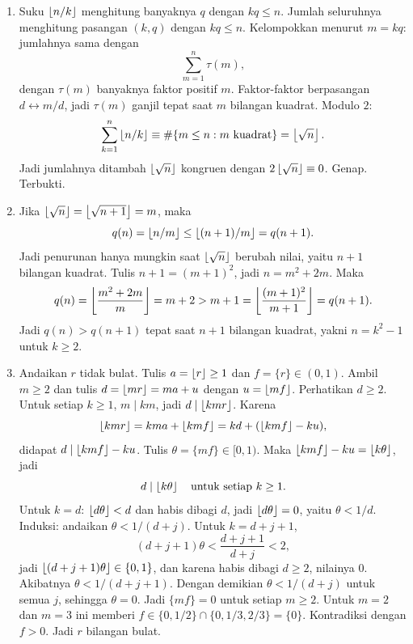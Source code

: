 \documentclass[12pt]{scrartcl}
\begin{document}
\begin{enumerate}[resume]
	\item Suku $\left\lfloor n/k \right\rfloor$ menghitung banyaknya $q$ dengan $kq \le n$.
	Jumlah seluruhnya menghitung pasangan $(k, q)$ dengan $kq \le n$.
	Kelompokkan menurut $m = kq$: jumlahnya sama dengan
	\[ \sum_{m=1}^{n} \tau(m), \]
	dengan $\tau(m)$ banyaknya faktor positif $m$.
	Faktor-faktor berpasangan $d \leftrightarrow m/d$,
	jadi $\tau(m)$ ganjil tepat saat $m$ bilangan kuadrat.
	Modulo $2$:
	\[ \sum_{k=1}^{n}\left\lfloor n/k \right\rfloor
	\equiv \#\{m \le n : m \text{ kuadrat}\}
	= \left\lfloor \sqrt{n} \right\rfloor. \]
	Jadi jumlahnya ditambah $\left\lfloor \sqrt{n} \right\rfloor$
	kongruen dengan $2\left\lfloor \sqrt{n} \right\rfloor \equiv 0$.
	Genap. Terbukti.

	\item Jika $\left\lfloor \sqrt{n} \right\rfloor = \left\lfloor \sqrt{n+1} \right\rfloor = m$, maka
	\[ q(n) = \left\lfloor n/m \right\rfloor \le \left\lfloor (n+1)/m \right\rfloor = q(n+1). \]
	Jadi penurunan hanya mungkin saat $\left\lfloor \sqrt{n} \right\rfloor$ berubah nilai,
	yaitu $n+1$ bilangan kuadrat.
	Tulis $n+1 = (m+1)^2$, jadi $n = m^2 + 2m$. Maka
	\[ q(n) = \left\lfloor \frac{m^2+2m}{m} \right\rfloor = m + 2
	> m + 1 = \left\lfloor \frac{(m+1)^2}{m+1} \right\rfloor = q(n+1). \]
	Jadi $q(n) > q(n+1)$ tepat saat $n+1$ bilangan kuadrat,
	yakni $n = k^2 - 1$ untuk $k \ge 2$.

	\item Andaikan $r$ tidak bulat.
	Tulis $a = \left\lfloor r \right\rfloor \ge 1$ dan $f = \{r\} \in (0, 1)$.
	Ambil $m \ge 2$ dan tulis $d = \left\lfloor mr \right\rfloor = ma + u$
	dengan $u = \left\lfloor mf \right\rfloor$. Perhatikan $d \ge 2$.
	Untuk setiap $k \ge 1$, $m \mid km$, jadi $d \mid \left\lfloor kmr \right\rfloor$.
	Karena
	\[ \left\lfloor kmr \right\rfloor = kma + \left\lfloor kmf \right\rfloor = kd + (\left\lfloor kmf \right\rfloor - ku), \]
	didapat $d \mid \left\lfloor kmf \right\rfloor - ku$.
	Tulis $\theta = \{mf\} \in [0, 1)$. Maka
	$\left\lfloor kmf \right\rfloor - ku = \left\lfloor k\theta \right\rfloor$, jadi
	\[ d \mid \left\lfloor k\theta \right\rfloor \quad \text{untuk setiap } k \ge 1. \]
	Untuk $k = d$: $\left\lfloor d\theta \right\rfloor < d$ dan habis dibagi $d$,
	jadi $\left\lfloor d\theta \right\rfloor = 0$, yaitu $\theta < 1/d$.
	Induksi: andaikan $\theta < 1/(d+j)$. Untuk $k = d+j+1$,
	\[ (d+j+1)\theta < \frac{d+j+1}{d+j} < 2, \]
	jadi $\left\lfloor (d+j+1)\theta \right\rfloor \in \{0, 1\}$,
	dan karena habis dibagi $d \ge 2$, nilainya $0$.
	Akibatnya $\theta < 1/(d+j+1)$.
	Dengan demikian $\theta < 1/(d+j)$ untuk semua $j$,
	sehingga $\theta = 0$.
	Jadi $\{mf\} = 0$ untuk setiap $m \ge 2$.
	Untuk $m = 2$ dan $m = 3$ ini memberi
	$f \in \{0, 1/2\} \cap \{0, 1/3, 2/3\} = \{0\}$.
	Kontradiksi dengan $f > 0$. Jadi $r$ bilangan bulat.

\end{enumerate}
\end{document}
